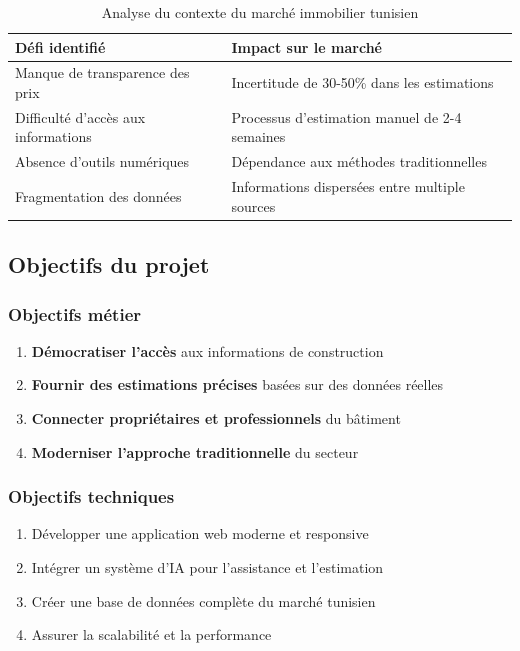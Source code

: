 \documentclass[12pt,a4paper]{report}
\begin{document}
\begin{table}[H]
    \centering
    \caption{Analyse du contexte du marché immobilier tunisien}
    \begin{tabular}{|p{5cm}|p{8cm}|}
        \hline
        \textbf{Défi identifié} & \textbf{Impact sur le marché} \\
        \hline
        Manque de transparence des prix & Incertitude de 30-50\% dans les estimations \\
        \hline
        Difficulté d'accès aux informations & Processus d'estimation manuel de 2-4 semaines \\
        \hline
        Absence d'outils numériques & Dépendance aux méthodes traditionnelles \\
        \hline
        Fragmentation des données & Informations dispersées entre multiple sources \\
        \hline
    \end{tabular}
\end{table}

\subsection{Objectifs du projet}

\subsubsection{Objectifs métier}
\begin{enumerate}
    \item \textbf{Démocratiser l'accès} aux informations de construction
    \item \textbf{Fournir des estimations précises} basées sur des données réelles
    \item \textbf{Connecter propriétaires et professionnels} du bâtiment
    \item \textbf{Moderniser l'approche traditionnelle} du secteur
\end{enumerate}

\subsubsection{Objectifs techniques}
\begin{enumerate}
    \item Développer une application web moderne et responsive
    \item Intégrer un système d'IA pour l'assistance et l'estimation
    \item Créer une base de données complète du marché tunisien
    \item Assurer la scalabilité et la performance
\end{enumerate}
\end{document}
